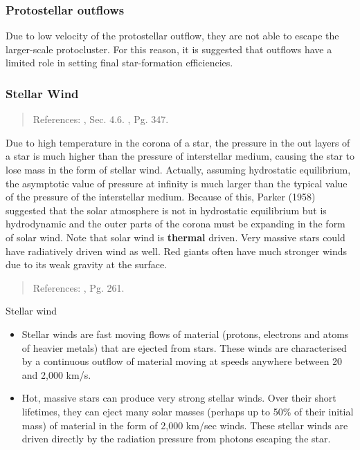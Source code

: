 \subsubsection{Protostellar outflows}
\label{sec:orgbb0c9b8}
Due to low velocity of the protostellar outflow, they are not able to escape the larger-scale protocluster. For this reason, it is suggested that outflows have a limited role in setting final star-formation efficiencies.

\subsubsection{Stellar Wind}
\label{sec:org51888a4}
\begin{quote}
References: \cite{Choudhuri2010}, Sec. 4.6. \cite{Carroll2007}, Pg. 347.
\end{quote}

Due to high temperature in the corona of a star, the pressure in the out layers of a star is much higher than the pressure of interstellar medium, causing the star to lose mass in the form of stellar wind. Actually, assuming hydrostatic equilibrium, the asymptotic value of pressure at infinity is much larger than the typical value of the pressure of the interstellar medium. Because of this, Parker (1958) suggested that the solar atmosphere is not in hydrostatic equilibrium but is hydrodynamic and the outer parts of the corona must be expanding in the form of solar wind. Note that solar wind is \textbf{thermal} driven. Very massive stars could have radiatively driven wind as well. Red giants often have much stronger winds due to its weak gravity at the surface.

\begin{quote}
References: \cite{Krumholz2019}, Pg. 261.
\end{quote}

Stellar wind
\begin{itemize}
\item Stellar winds are fast moving flows of material (protons, electrons and atoms of heavier metals) that are ejected from stars. These winds are characterised by a continuous outflow of material moving at speeds anywhere between 20 and 2,000 km/s.
\item Hot, massive stars can produce very strong stellar winds. Over their short lifetimes, they can eject many solar masses (perhaps up to 50\% of their initial mass) of material in the form of 2,000 km/sec winds. These stellar winds are driven directly by the radiation pressure from photons escaping the star.
\end{itemize}


